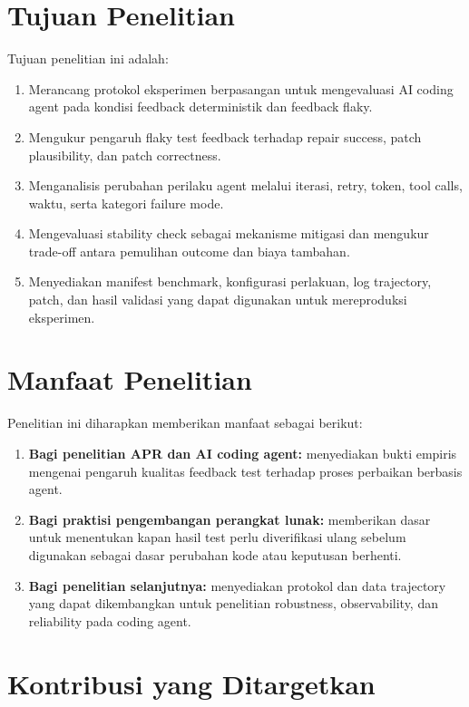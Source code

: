 \section{Tujuan Penelitian}

Tujuan penelitian ini adalah:

\begin{enumerate}[leftmargin=*]
    \item Merancang protokol eksperimen berpasangan untuk mengevaluasi AI coding agent pada kondisi feedback deterministik dan feedback flaky.
    \item Mengukur pengaruh flaky test feedback terhadap repair success, patch plausibility, dan patch correctness.
    \item Menganalisis perubahan perilaku agent melalui iterasi, retry, token, tool calls, waktu, serta kategori failure mode.
    \item Mengevaluasi stability check sebagai mekanisme mitigasi dan mengukur trade-off antara pemulihan outcome dan biaya tambahan.
    \item Menyediakan manifest benchmark, konfigurasi perlakuan, log trajectory, patch, dan hasil validasi yang dapat digunakan untuk mereproduksi eksperimen.
\end{enumerate}

\section{Manfaat Penelitian}

Penelitian ini diharapkan memberikan manfaat sebagai berikut:

\begin{enumerate}[leftmargin=*]
    \item \textbf{Bagi penelitian APR dan AI coding agent:} menyediakan bukti empiris mengenai pengaruh kualitas feedback test terhadap proses perbaikan berbasis agent.
    \item \textbf{Bagi praktisi pengembangan perangkat lunak:} memberikan dasar untuk menentukan kapan hasil test perlu diverifikasi ulang sebelum digunakan sebagai dasar perubahan kode atau keputusan berhenti.
    \item \textbf{Bagi penelitian selanjutnya:} menyediakan protokol dan data trajectory yang dapat dikembangkan untuk penelitian robustness, observability, dan reliability pada coding agent.
\end{enumerate}

\section{Kontribusi yang Ditargetkan}


